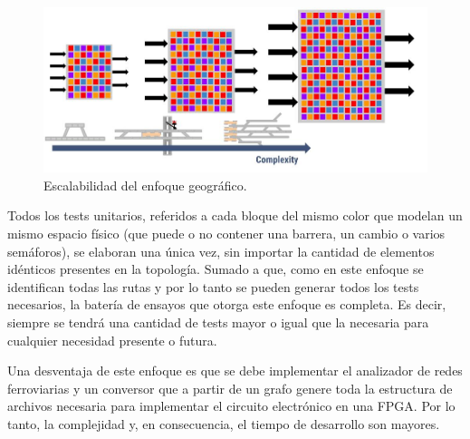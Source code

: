 			\begin{figure}[h]
			\centering
				\includegraphics[scale=.4]{./Figures/Geografico_complejidad}
				\caption{Escalabilidad del enfoque geográfico.}
				\label{fig:Escala_Geografico}
			\end{figure}
		
			Todos los tests unitarios, referidos a cada bloque del mismo color que modelan un mismo espacio físico (que puede o no contener una barrera, un cambio o varios semáforos), se elaboran una única vez, sin importar la cantidad de elementos idénticos presentes en la topología. Sumado a que, como en este enfoque se identifican todas las rutas y por lo tanto se pueden generar todos los tests necesarios, la batería de ensayos que otorga este enfoque es completa. Es decir, siempre se tendrá una cantidad de tests mayor o igual que la necesaria para cualquier necesidad presente o futura.
		
			Una desventaja de este enfoque es que se debe implementar el analizador de redes ferroviarias y un conversor que a partir de un grafo genere toda la estructura de archivos necesaria para implementar el circuito electrónico en una FPGA. Por lo tanto, la complejidad y, en consecuencia, el tiempo de desarrollo son mayores.
			
			
			
